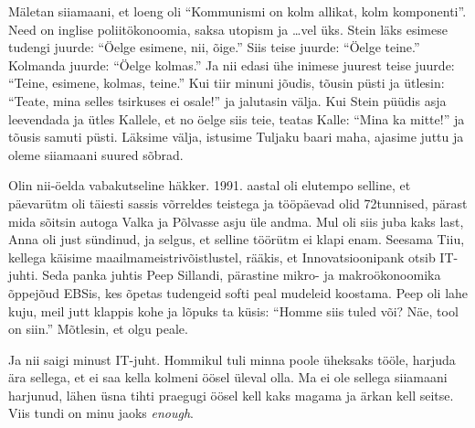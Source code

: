 Mäletan siiamaani, et loeng oli \enquote{Kommunismi on kolm allikat, kolm 
komponenti}. Need on inglise poliitökonoomia, saksa utopism ja \ldots vel 
üks. Stein läks esimese tudengi juurde: 
\enquote{Öelge esimene, nii, õige.} Siis teise juurde: \enquote{Öelge teine.} 
Kolmanda juurde: \enquote{Öelge kolmas.} Ja nii edasi ühe inimese juurest teise juurde: 
\enquote{Teine, esimene, kolmas, teine.} Kui tiir minuni jõudis, tõusin püsti 
ja ütlesin: \enquote{Teate, mina selles tsirkuses ei osale!} ja jalutasin välja. 
Kui Stein püüdis asja leevendada ja ütles Kallele, et no öelge siis 
teie, teatas Kalle: \enquote{Mina ka mitte!} ja tõusis samuti püsti. Läksime 
välja, istusime Tuljaku baari maha, ajasime juttu ja oleme siiamaani suured 
sõbrad.


Olin nii-öelda vabakutseline häkker. 1991. aastal oli 
elutempo selline, et päevarütm oli täiesti sassis võrreldes teistega ja 
tööpäevad olid 72tunnised, pärast mida sõitsin autoga Valka ja Põlvasse asju 
üle andma. Mul oli siis juba kaks last, Anna oli just sündinud, ja selgus, et 
selline töörütm ei klapi enam. Seesama Tiiu, 
kellega käisime maailmameistrivõistlustel, rääkis, et 
Innovatsioonipank otsib IT-juhti. Seda panka juhtis Peep 
Sillandi, pärastine mikro- ja makroökonoomika 
õppejõud EBSis, kes õpetas tudengeid softi peal mudeleid koostama. 
Peep oli lahe kuju, meil jutt klappis kohe ja lõpuks ta küsis: \enquote{Homme siis tuled 
või? Näe, tool on siin.} Mõtlesin, et olgu peale. 

Ja nii saigi minust IT-juht. Hommikul tuli minna poole üheksaks tööle, harjuda ära
sellega, et ei saa kella kolmeni öösel üleval olla. Ma ei ole sellega siiamaani 
harjunud, lähen üsna tihti praegugi öösel kell kaks magama ja ärkan kell 
seitse. Viis tundi on minu jaoks \emph{enough}. 

